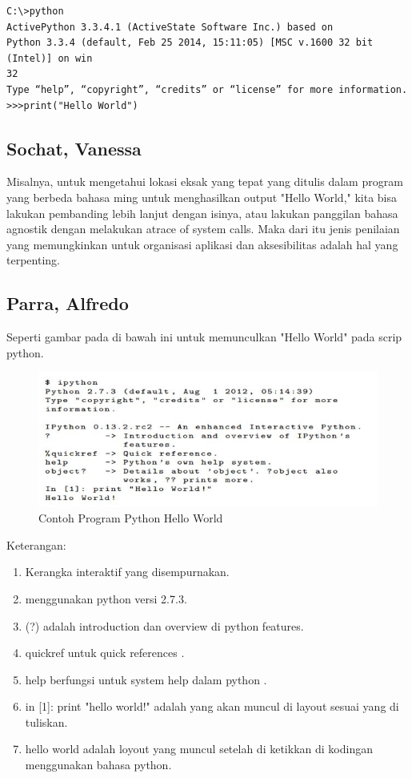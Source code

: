 \documentclass[12pt]{article}
\begin{document}
\begin{verbatim}
C:\>python
ActivePython 3.3.4.1 (ActiveState Software Inc.) based on
Python 3.3.4 (default, Feb 25 2014, 15:11:05) [MSC v.1600 32 bit (Intel)] on win
32
Type “help”, “copyright”, “credits” or “license” for more information.
>>>print("Hello World")

\end{verbatim}

\subsection{Sochat, Vanessa}
Misalnya, untuk mengetahui lokasi eksak yang tepat yang ditulis dalam program yang berbeda bahasa ming untuk menghasilkan output "Hello World," kita bisa lakukan pembanding lebih lanjut dengan isinya, atau lakukan panggilan bahasa agnostik dengan melakukan atrace of system calls. Maka dari itu jenis penilaian yang memungkinkan untuk organisasi aplikasi dan aksesibilitas adalah hal yang terpenting\cite{sochat2018scientific}.

\subsection{Parra, Alfredo}
Seperti gambar pada di bawah ini untuk memunculkan "Hello World" pada scrip python.


\begin{figure}[ht]
\centerline{\includegraphics[width=1\textwidth]{coding.JPG}}
\caption{Contoh Program Python Hello World}
\label{gambarHWI1}
\end{figure}

Keterangan:
\begin{enumerate}
\item Kerangka interaktif yang disempurnakan.
\item menggunakan python versi 2.7.3.
\item (?) adalah introduction dan overview di python features.
\item quickref untuk quick references .
\item help berfungsi untuk system help dalam python .
\item in [1]: print "hello world!" adalah yang akan muncul di layout sesuai yang di tuliskan.
\item hello world adalah loyout yang muncul setelah di ketikkan di kodingan menggunakan bahasa python.
\end{enumerate}
\end{document}
